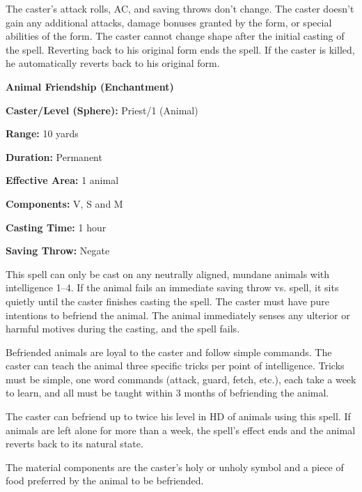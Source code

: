 \begin{multicols}{2}
The caster's attack rolls, AC, and saving throws don't change.  The caster doesn't gain any additional attacks, damage bonuses granted by the form, or special abilities of the form.  The caster cannot change shape after the initial casting of the spell.  Reverting back to his original form ends the spell.  If the caster is killed, he automatically reverts back to his original form.

\vspace{1em}

\noindent
\begin{minipage}{\columnwidth}

\noindent \textbf{Animal Friendship (Enchantment)}

\noindent \textbf{Caster/Level (Sphere):} Priest/1 (Animal)

\noindent \textbf{Range:} 10 yards

\noindent \textbf{Duration:} Permanent

\noindent \textbf{Effective Area:} 1 animal

\noindent \textbf{Components:} V, S and M

\noindent \textbf{Casting Time:} 1 hour

\noindent \textbf{Saving Throw:} Negate

\end{minipage}

This spell can only be cast on any neutrally aligned, mundane animals with intelligence 1--4.  If the animal fails an immediate saving throw vs. spell, it sits quietly until the caster finishes casting the spell.  The caster must have pure intentions to befriend the animal.  The animal immediately senses any ulterior or harmful motives during the casting, and the spell fails.

Befriended animals are loyal to the caster and follow simple commands.  The caster can teach the animal three specific tricks per point of intelligence.  Tricks must be simple, one word commands (attack, guard, fetch, etc.), each take a week to learn, and all must be taught within 3 months of befriending the animal.  

The caster can befriend up to twice his level in HD of animals using this spell.  If animals are left alone for more than a week, the spell's effect ends and the animal reverts back to its natural state.

The material components are the caster's holy or unholy symbol and a piece of food preferred by the animal to be befriended.  


\end{multicols}
